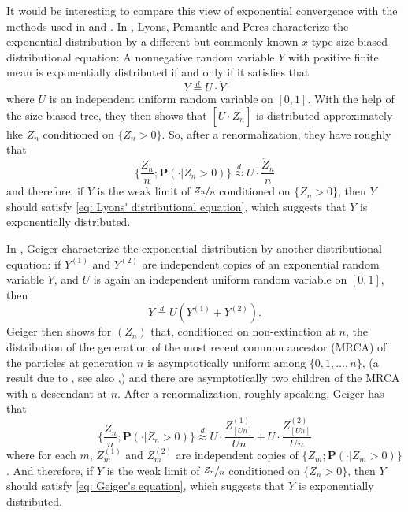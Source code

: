 \documentclass[12pt,a4paper]{amsart}
\numberwithin{equation}{section}
\begin{document}
	It would be interesting to compare this view of exponential convergence with the methods used in \cite{geiger2000new} and \cite{lyons1995conceptual}. 
	In \cite{lyons1995conceptual}, Lyons, Pemantle and Peres characterize the exponential distribution by a different but commonly known $x$-type size-biased distributional equation: 
	A nonnegative random variable $Y$ with positive finite mean is exponentially distributed if and only if it satisfies that 
\begin{equation}
\label{eq: Lyons' distributional equation}
		Y 
		\overset{d}= U \cdot \dot Y
\end{equation}
	where $U$ is an independent uniform random variable on $[0,1]$.
	With the help of the size-biased tree, they then shows that $[U \cdot \dot Z_n]$ is distributed approximately like $Z_n$ conditioned on $\{Z_n > 0\}$. 
	So, after a renormalization, they have roughly that 
\begin{equation}
\label{eq: Lyons' insight}
	\big\{\frac{Z_n}{n} ; \mathbf P(  \cdot| Z_n > 0) \big\} 
	\overset{d}{\approx} U \cdot \frac{ \dot Z_n}{n}
\end{equation}
	and therefore, if $Y$ is the weak limit of $\nicefrac{Z_n}{n}$ conditioned on $\{Z_n > 0\}$, then $Y$ should satisfy \eqref{eq: Lyons' distributional equation}, which suggests that $Y$ is exponentially distributed. 
	
	In \cite{geiger2000new}, Geiger characterize the exponential distribution by another distributional equation: if $Y^{(1)}$ and $Y^{(2)}$ are independent copies of an exponential random variable $Y$, and $U$ is again an independent uniform random variable on $[0,1]$, then 
\begin{equation}
\label{eq: Geiger's equation}
	Y
	\overset{d} = U (Y^{(1)} + Y^{(2)}).
\end{equation}
	Geiger then shows for $(Z_n)$ that, conditioned on non-extinction at $n$, the distribution of the generation of the most recent common ancestor (MRCA) of the particles at generation $n$ is asymptotically uniform among $\{0,1,\dots,n\}$, (a result due to \cite{Zubkov1975}, see also \cite{geiger1999elementary},) and there are asymptotically two children of the MRCA with a descendant at $n$. 
	After a renormalization, roughly speaking, Geiger has that 
\begin{equation}
\label{eq: Geiger's insight}
	\big\{\frac{Z_n}{n} ; \mathbf P(  \cdot| Z_n > 0) \big\} 
	\overset{d}{\approx} U \cdot \frac{ Z^{(1)}_{[Un]}}{Un} + U \cdot \frac{ Z^{(2)}_{[Un]}}{Un} 
\end{equation}
	where for each $m$, $Z_m^{(1)}$ and $Z_m^{(2)}$ are independent copies of $\{Z_m; \mathbf P(\cdot | Z_m > 0)\}$.
	And therefore, if $Y$ is the weak limit of $\nicefrac{Z_n}{n}$ conditioned on $\{Z_n > 0\}$, then $Y$ should satisfy \eqref{eq: Geiger's equation}, which suggests that $Y$ is exponentially distributed. 
	
\end{document}
